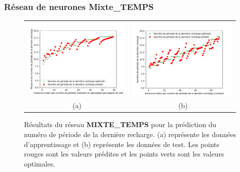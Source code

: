 \documentclass[hyperref={bookmarks=false},aspectratio=169]{beamer}
\begin{document}
\begin{frame}
\frametitle{Réseau de neurones Mixte\_TEMPS}


\begin{figure}[H]
	\centering
	\begin{tabular}{c c}
		\includegraphics[width=6cm]{figures/time_6000_prediction_courbe_Al_He_complet_train.pdf}&
		\includegraphics[width=6cm]{figures/time_6000_prediction_courbe_Al_He_complet_test.pdf}
		\\
		(a) & (b)
	\end{tabular}
	\caption[Résultats du  réseau MIXTE\_TEMPS]{Résultats du  réseau \textbf{MIXTE\_TEMPS} pour la prédiction du numéro de période de la dernière recharge. (a) représente les données d'apprentissage et (b) représente les données de test. Les points rouges sont les valeurs prédites et les points verts sont les valeurs optimales.}\label{time_6000_prediction_courbe_Al_He_complet}
\end{figure}
\end{frame}
\end{document}
